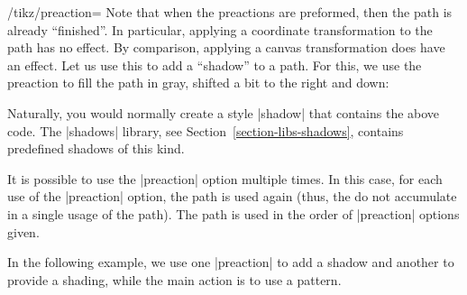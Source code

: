 \begin{key}{/tikz/preaction=}
    Note that when the preactions are preformed, then the path is already
    ``finished''. In particular, applying a coordinate transformation to the
    path has no effect. By comparison, applying a canvas transformation does
    have an effect. Let us use this to add a ``shadow'' to a path. For this, we
    use the preaction to fill the path in gray, shifted a bit to the right and
    down:
\begin{codeexample}[]
\end{codeexample}

    Naturally, you would normally create a style |shadow| that contains the
    above code. The |shadows| library, see Section~\ref{section-libs-shadows},
    contains predefined shadows of this kind.

    It is possible to use the |preaction| option multiple times. In this case,
    for each use of the |preaction| option, the path is used again (thus, the
     do not accumulate in a single usage of the path). The path
    is used in the order of |preaction| options given.

    In the following example, we use one |preaction| to add a shadow and
    another to provide a shading, while the main action is to use a pattern.
\begin{codeexample}[preamble={\usetikzlibrary{patterns}}]
\end{codeexample}


\end{key}
